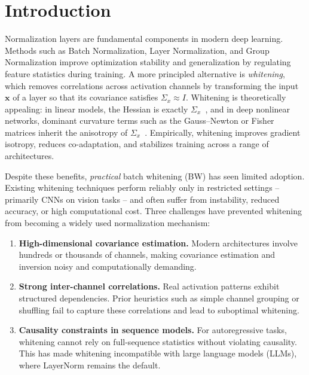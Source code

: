 \section{Introduction}
\label{sec:introduction}

Normalization layers are fundamental components in modern deep learning. 
Methods such as Batch Normalization, Layer Normalization, and Group Normalization 
improve optimization stability and generalization by regulating feature statistics during training. 
A more principled alternative is \emph{whitening}, which removes correlations across activation channels 
by transforming the input $\mathbf{x}$ of a layer so that its covariance satisfies 
$\Sigma_x \approx I$. Whitening is theoretically appealing: in linear models, 
the Hessian is exactly $\Sigma_x$~\citep{amari1998natural,martens2010deep}, 
and in deep nonlinear networks, dominant curvature terms such as the Gauss--Newton or Fisher matrices 
inherit the anisotropy of $\Sigma_x$~\citep{desjardins2015natural,cho2021improving}. 
Empirically, whitening improves gradient isotropy, reduces co-adaptation, 
and stabilizes training across a range of architectures.

Despite these benefits, \emph{practical} batch whitening (BW) has seen limited adoption. 
Existing whitening techniques perform reliably only in restricted settings -- primarily CNNs on vision tasks -- 
and often suffer from instability, reduced accuracy, or high computational cost. 
Three challenges have prevented whitening from becoming a widely used normalization mechanism:

\begin{enumerate}
    \item \textbf{High-dimensional covariance estimation.} 
    Modern architectures involve hundreds or thousands of channels, 
    making covariance estimation and inversion noisy and computationally demanding.

    \item \textbf{Strong inter-channel correlations.} 
    Real activation patterns exhibit structured dependencies. 
    Prior heuristics such as simple channel grouping or shuffling fail to capture these correlations 
    and lead to suboptimal whitening.

    \item \textbf{Causality constraints in sequence models.} 
    For autoregressive tasks, whitening cannot rely on full-sequence statistics 
    without violating causality. 
    This has made whitening incompatible with large language models (LLMs), 
    where LayerNorm remains the default.
\end{enumerate}


